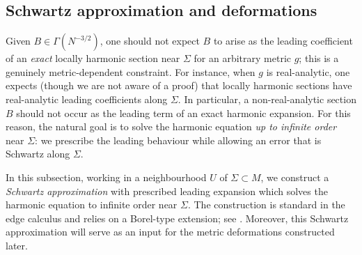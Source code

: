 \documentclass[11pt]{amsart}
\begin{document}
\subsection{Schwartz approximation and deformations}
Given \(B\in \Gamma(N^{-3/2})\), one should not expect \(B\) to arise as the leading coefficient of
an \emph{exact} locally harmonic section near \(\Sigma\) for an arbitrary metric \(g\); this is a
genuinely metric-dependent constraint. For instance, when \(g\) is real-analytic, one expects
(though we are not aware of a proof) that locally harmonic sections have real-analytic leading
coefficients along \(\Sigma\). In particular, a non-real-analytic section \(B\) should not occur as
the leading term of an exact harmonic expansion. For this reason, the natural goal is to solve the
harmonic equation \emph{up to infinite order} near \(\Sigma\): we prescribe the leading behaviour while
allowing an error that is Schwartz along \(\Sigma\).

In this subsection, working in a neighbourhood \(U\) of \(\Sigma\subset M\), we construct a
\emph{Schwartz approximation} with prescribed leading expansion which solves the harmonic equation
to infinite order near \(\Sigma\). The construction is standard in the edge calculus and relies on
a Borel-type extension; see \cite{MazzeoHaydysTakahashi,Mazzeo1991}. Moreover, this Schwartz approximation will serve as an input for the metric deformations constructed later.
\end{document}
